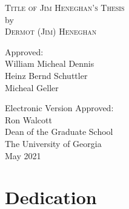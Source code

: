 \documentclass[
reprint,
amsmath,amssymb,
aip,
jap,
floatfix,
]{revtex4-2}
\newcommand{\majorprof}{William Micheal Dennis} %
\newcommand{\proftwo}{Heinz Bernd Schuttler} %
\newcommand{\profthree}{Micheal Geller} %
\newcommand{\thesisyear}{2021} %
\newcommand{\yourname}{Dermot (Jim) Heneghan} %
\newcommand{\thesistitle}{Title of Jim Heneghan's Thesis} %
\newcommand{\graddean}{Ron Walcott} %
\begin{document}
\newpage
\thispagestyle{empty}
\vspace*{18pt}
\begin{center}
\textsc{\thesistitle}\\[18pt]
by\\[18pt]
\textsc{\yourname}
\end{center}
\vspace*{50pt}
\begin{center}
\hskip 48pt {Approved:}\\
\vskip 12pt
\hspace*{155pt}\majorprof\\
\vskip 12pt
\hspace*{155pt}\proftwo\\
\hspace*{155pt}\makebox[100pt][l]{~                }\profthree        \\
\end{center}
\vfill
\begin{flushleft}
Electronic Version Approved:\\[12pt]
\graddean\\
Dean of the Graduate School\\
The University of Georgia\\
May \thesisyear
\end{flushleft}


\chapter*{Dedication}




\tableofcontents %
\end{document}
